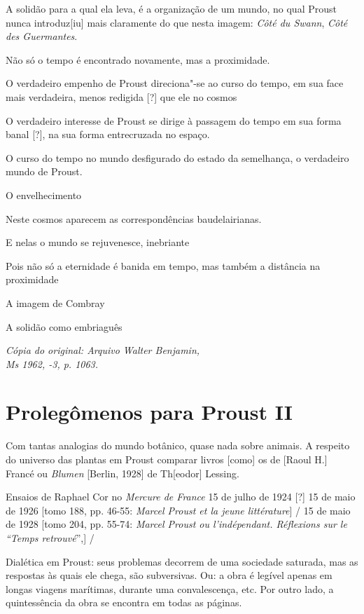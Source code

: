 A solidão para a qual ela leva, é a organização de um mundo, no qual
Proust nunca introduz{[}iu{]} mais claramente do que nesta imagem:
\emph{Côté du Swann}, \emph{Côté des Guermantes}.

Não só o tempo é encontrado novamente, mas a proximidade.

O verdadeiro empenho de Proust direciona"-se ao curso do tempo, em sua
face mais verdadeira, menos redigida {[}?{]} que ele no cosmos

O verdadeiro interesse de Proust se dirige à passagem do tempo em sua
forma banal {[}?{]}, na sua forma entrecruzada no espaço.

O curso do tempo no mundo desfigurado do estado da semelhança, o
verdadeiro mundo de Proust.

O envelhecimento

Neste cosmos aparecem as correspondências baudelairianas.

E nelas o mundo se rejuvenesce, inebriante

Pois não só a eternidade é banida em tempo, mas também a distância na
proximidade

A imagem de Combray

A solidão como embriaguês


\begin{flushright}
\emph{\footnotesize{Cópia do original: Arquivo Walter Benjamin,\\ Ms 1962, -3, p. 1063.}}
\end{flushright}

\section{Prolegômenos para Proust II}

Com tantas analogias do mundo botânico, quase nada sobre animais. A
respeito do universo das plantas em Proust comparar livros {[}como{]} os
de {[}Raoul H.{]} Francé ou \emph{Blumen} {[}Berlin, 1928{]} de Th{[}eodor{]} Lessing.

Ensaios de Raphael Cor no \emph{Mercure de France} 15 de julho de 1924
{[}?{]} 15 de maio de 1926 {[}tomo 188, pp. 46-55: \emph{Marcel Proust et
la jeune littérature}{]} / 15 de maio de 1928 {[}tomo 204, pp. 55-74:
\emph{Marcel Proust ou l'indépendant. Réflexions sur le ``Temps
retrouvé}'',{]} /

Dialética em Proust: seus problemas decorrem de uma sociedade saturada,
mas as respostas às quais ele chega, são subversivas. Ou: a obra é
legível apenas em longas viagens marítimas, durante uma convalescença,
etc. Por outro lado, a quintessência da obra se encontra em todas as
páginas.

